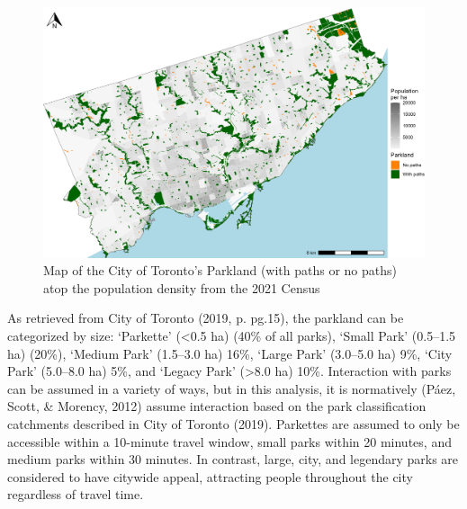 \documentclass[
11pt, %
oneside, %
english, %
singlespacing, %
]{macthesis} %
\begin{document}
\begin{figure}

{\centering \includegraphics[width=6in]{./data/figures/chp2-parkland_paths_plot} 

}

\caption{\label{fig:chp2-parkland_paths_plot}Map of the City of Toronto's Parkland (with paths or no paths) atop the population density from the 2021 Census}\label{fig:unnamed-chunk-8}
\end{figure}

As retrieved from City of Toronto (2019, p. pg.15), the parkland can be categorized by size: `Parkette' (\textless0.5 ha) (40\% of all parks), `Small Park' (0.5--1.5 ha) (20\%), `Medium Park' (1.5--3.0 ha) 16\%, `Large Park' (3.0--5.0 ha) 9\%, `City Park' (5.0--8.0 ha) 5\%, and `Legacy Park' (\textgreater8.0 ha) 10\%. Interaction with parks can be assumed in a variety of ways, but in this analysis, it is normatively (Páez, Scott, \& Morency, 2012) assume interaction based on the park classification catchments described in City of Toronto (2019). Parkettes are assumed to only be accessible within a 10-minute travel window, small parks within 20 minutes, and medium parks within 30 minutes. In contrast, large, city, and legendary parks are considered to have citywide appeal, attracting people throughout the city regardless of travel time.
\end{document}
